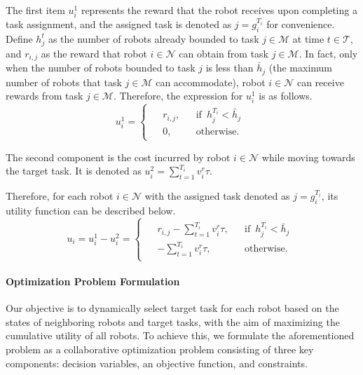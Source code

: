 \documentclass[lettersize,journal]{IEEEtran}
\begin{document}
The first item $u_i^1$ represents the reward that the robot receives upon completing a task assignment, and the assigned task is denoted  as $j=g_i^{T_i}$ for convenience. Define $h_j^t$ as the number of robots already bounded to task $j\in\mathcal{M}$ at time $t\in\mathcal{T}$, and $r_{i,j}$ as the reward that robot $i\in\mathcal{N}$ can obtain from task $j\in\mathcal{M}$. In fact, only when the number of robots bounded to task $j$ is less than  ${\bar{h}}_j$ (the maximum number of robots that task $j\in\mathcal{M}$ can accommodate), robot $i\in\mathcal{N}$ can receive rewards from task $j\in\mathcal{M}$. Therefore, the expression for $u_i^1$ is as follows.
\begin{equation}
u_i^1 =
\begin{cases}
    \begin{aligned}
        & r_{i,j}, && \text{if}\enspace h_j^{T_i}<\bar{h}_j\\
        & 0, &&\text{otherwise}.
    \end{aligned}
\end{cases}\label{eq3}
\end{equation}

The second component is the cost incurred by robot $i\in\mathcal{N}$ while moving towards the target task. It is denoted as $u_i^2=\sum_{t=1}^{T_i}{v_i^r\tau}$. 


Therefore, for each robot $i\in\mathcal{N}$  with the assigned task  denoted  as $j=g_i^{T_i}$, its utility function can be described below.
\begin{equation}
u_i=u_i^1-u_i^2=
\begin{cases}
    \begin{aligned}
        & r_{i,j}-\sum_{t=1}^{T_i}v_i^r\tau, && \text{if}\enspace h_j^{T_i}<\bar{h}_j\\
        & -\sum_{t=1}^{T_i}v_i^r\tau, &&\text{otherwise}.
    \end{aligned}
\end{cases}\label{eq4}
\end{equation}

\paragraph{\textbf{Optimization Problem Formulation}} Our objective is to dynamically select target task for each robot   based on the states of  neighboring robots and target tasks, with the aim of maximizing the cumulative utility of all robots.  To achieve this, we formulate the aforementioned problem as a collaborative optimization problem consisting of three key components: decision variables, an objective function, and constraints.
\end{document}
